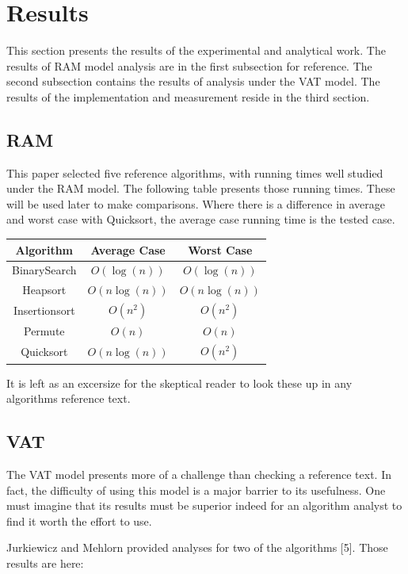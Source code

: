 \section{Results}

  This section presents the results of the experimental and analytical work.
  The results of RAM model analysis are in the first subsection for reference.
  The second subsection contains the results of analysis under the VAT model.
  The results of the implementation and measurement reside in the third
  section.

  \subsection{RAM}
    This paper selected five reference algorithms, with running times well 
    studied under the RAM model. The following table presents those running
    times. These will be used later to make comparisons. Where there is a
    difference in average and worst case with Quicksort, the average case
    running time is the tested case.
    
    \begin{tabular}{ccc}
      Algorithm     & Average Case  & Worst Case   \\\hline
      BinarySearch  & $O(\log(n))$  & $O(\log(n))$ \\
      Heapsort      & $O(n\log(n))$ & $O(n\log(n))$\\
      Insertionsort & $O(n^2)$      & $O(n^2)$     \\
      Permute       & $O(n)$        & $O(n)$       \\
      Quicksort     & $O(n\log(n))$ & $O(n^2)$     \\
    \end{tabular}
    
    It is left as an excersize for the skeptical reader to look these up in any
    algorithms reference text.

  \subsection{VAT}
    The VAT model presents more of a challenge than checking a reference text.
    In fact, the difficulty of using this model is a major barrier to its
    usefulness. One must imagine that its results must be superior indeed for
    an algorithm analyst to find it worth the effort to use.
    
    Jurkiewicz and Mehlorn provided analyses for two of the algorithms [5]. 
    Those results are here:\\
    

